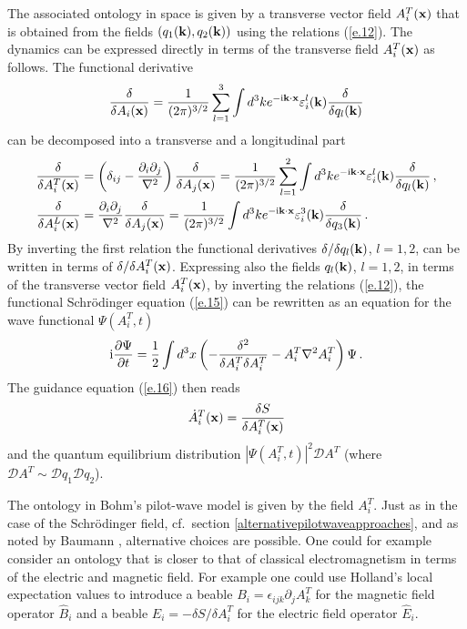 \documentclass[12pt]{article}
\def\de{\delta}
\def\ii{\textrm i}
\begin{document}
The associated ontology in space is given by a transverse vector field $A^T_i({\bf x})$ that is obtained from the fields $(q_1({\bf k}),q_2({\bf k}))$ using the relations (\ref{e.12}). The dynamics can be expressed directly in terms of the transverse field $A^T_i({\bf x})$ as follows. The functional derivative 
\begin{equation}
\frac{\de}{\de A_i({\bf x})} = \frac{1}{(2\pi)^{3/2}} \sum^3_{l=1} \int d^3 k e^{-\ii {\bf k} \cdot {\bf x}} \varepsilon^l_i({\bf k}) \frac{\de}{\de q_l({\bf k})}
\label{e.17}
\end{equation}
can be decomposed into a transverse and a longitudinal part
\begin{align}
\frac{\delta}{\delta A^T_i({\bf x})} &= \left(\delta_{ij} -  \frac{\partial_i \partial_j }{\nabla^2}\right) \frac{\delta}{\delta A_j({\bf x})} = \frac{1}{(2\pi)^{3/2}} \sum^2_{l=1} \int d^3 k e^{- \ii {\bf k} \cdot {\bf x}} \varepsilon^l_i({\bf k}) \frac{\delta}{\delta q_l({\bf k})} \,,\nonumber\\
\frac{\delta}{\delta A^L_i({\bf x})} &=  \frac{\partial_i \partial_j }{\nabla^2} \frac{\delta}{\delta A_j({\bf x})} =\frac{1}{(2\pi)^{3/2}}  \int d^3 k e^{-\ii {\bf k}  \cdot {\bf x}}\varepsilon^3_i({\bf k}) \frac{\delta}{\delta q_3({\bf k})}\,.
\label{e.18}
\end{align}
By inverting the first relation the functional derivatives $\delta/\delta q_l({\bf k})$, $l=1,2$, can be written in terms of $\delta/\delta A^T_i({\bf x})$. Expressing also the fields $q_l({\bf k})$, $l=1,2$,  in terms of the transverse vector field $A^T_i({\bf x})$, by inverting the relations (\ref{e.12}), the functional Schr{\"o}\-ding\-er equation ({\ref{e.15}}) can be rewritten as an equation for the wave functional $\Psi(A^T_i,t)$ 
\begin{equation}
\ii\frac{\partial \Psi}{\partial t} = \frac{1}{2}  \int d^3 x \left( -\frac{\delta^2}{ \delta A^T_i \delta A^T_i} - A^T_i \nabla^2 A^T_i  \right)\Psi \,.
\label{e.20}
\end{equation}
The guidance equation ({\ref{e.16}}) then reads
\begin{equation}
{\dot A}^T_i({\bf x}) = \frac{\delta S}{\delta  A^T_i({\bf x})  }
\label{e.21}
\end{equation}
and the quantum equilibrium distribution $|\Psi(A^T_i,t)|^2 {\mathcal D} A^T$ (where ${\mathcal D} A^T \sim {\mathcal D}q_1{\mathcal D}q_2$).

The ontology in Bohm's pilot-wave model is given by the field $A^T_i$. Just as in the case of the Schr\"odinger field, cf.\ section \ref{alternativepilotwaveapproaches}, and as noted by Baumann \cite{baumann86}, alternative choices are possible. One could for example consider an ontology that is closer to that of classical electromagnetism in terms of the electric and magnetic field. For example one could use Holland's local expectation values to introduce a beable $B_i=\epsilon_{ijk}\partial_jA^T_k$ for the magnetic field operator ${\widehat B}_i$ and a beable $E_i = - \delta S / \delta A^T_i$ for the electric field operator ${\widehat E}_i$. 
\end{document}
